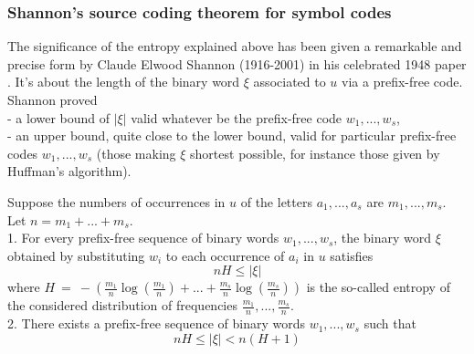 \subsubsection{Shannon's source coding theorem for symbol codes}
The significance of the entropy explained above has been given
a remarkable and precise form by
Claude Elwood Shannon (1916-2001) in his celebrated 1948 paper
\cite{shannon48}.
It's about the length of the binary word $\xi$ associated
to $u$ via a prefix-free code.
Shannon proved
\\- a lower bound of $|\xi|$ valid whatever be
the prefix-free code $w_1,...,w_s$,
\\- an upper bound, quite close to the lower bound,
valid for particular prefix-free codes $w_1,...,w_s$
(those making $\xi$ shortest possible, for instance those given
by Huffman's algorithm).
\begin{theorem}
Suppose the numbers of occurrences in $u$ of the letters
$a_1,...,a_s$ are $m_1,...,m_s$. Let $n=m_1+...+m_s$.
\medskip\\
1. For every prefix-free sequence of binary words $w_1,...,w_s$,
the binary word $\xi$ obtained by substituting $w_i$ to each
occurrence of $a_i$ in $u$
satisfies
$$
nH \leq |\xi|
$$
where
$H\ =\ -(\frac{m_1}{n}\log(\frac{m_1}{n}) +...
+ \frac{m_s}{n}\log(\frac{m_s}{n}))$
is the so-called entropy of the considered distribution
of frequencies $\frac{m_1}{n},...,\frac{m_s}{n}$.
\medskip\\
2. There exists a prefix-free sequence of binary words $w_1,...,w_s$
such that
$$
nH \leq |\xi| < n(H+1)
$$
\end{theorem}
